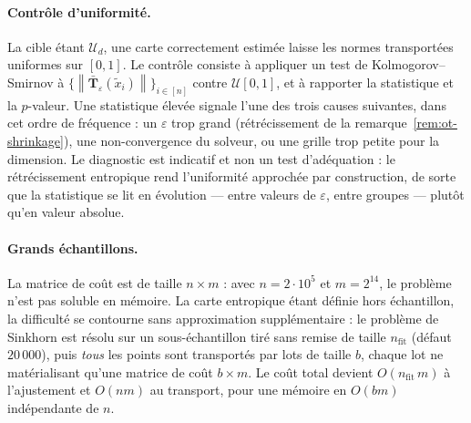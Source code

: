 \documentclass[11pt,a4paper]{article}
\theoremstyle{definition}
\theoremstyle{remark}
\newcommand{\Unif}{\mathcal{U}}
\newcommand{\norm}[1]{\left\lVert #1 \right\rVert}
\newcommand{\Tmap}{\mathbf{T}}
\begin{document}
\paragraph{Contrôle d'uniformité.} La cible étant $\Unif_d$, une carte correctement estimée
laisse les normes transportées uniformes sur $[0,1]$. Le contrôle consiste à appliquer un
test de Kolmogorov--Smirnov à $\{\norm{\bar{\Tmap}_\varepsilon(\tilde{x}_i)}\}_{i \in [n]}$
contre $\Unif[0,1]$, et à rapporter la statistique et la $p$-valeur. Une statistique élevée
signale l'une des trois causes suivantes, dans cet ordre de fréquence : un $\varepsilon$
trop grand (rétrécissement de la remarque~\ref{rem:ot-shrinkage}), une non-convergence du
solveur, ou une grille trop petite pour la dimension. Le diagnostic est indicatif et non
un test d'adéquation : le rétrécissement entropique rend l'uniformité approchée par
construction, de sorte que la statistique se lit en évolution --- entre valeurs de
$\varepsilon$, entre groupes --- plutôt qu'en valeur absolue.

\medskip

\paragraph{Grands échantillons.} La matrice de coût est de taille $n \times m$ : avec
$n = 2 \cdot 10^5$ et $m = 2^{14}$, le problème n'est pas soluble en mémoire. La carte
entropique étant définie hors échantillon, la difficulté se contourne sans approximation
supplémentaire : le problème de Sinkhorn est résolu sur un sous-échantillon tiré sans
remise de taille $n_{\mathrm{fit}}$ (défaut $20\,000$), puis \emph{tous} les points sont
transportés par lots de taille $b$, chaque lot ne matérialisant qu'une matrice de coût
$b \times m$. Le coût total devient $O(n_{\mathrm{fit}}\,m)$ à l'ajustement et $O(nm)$ au
transport, pour une mémoire en $O(bm)$ indépendante de $n$.

\medskip
\end{document}
